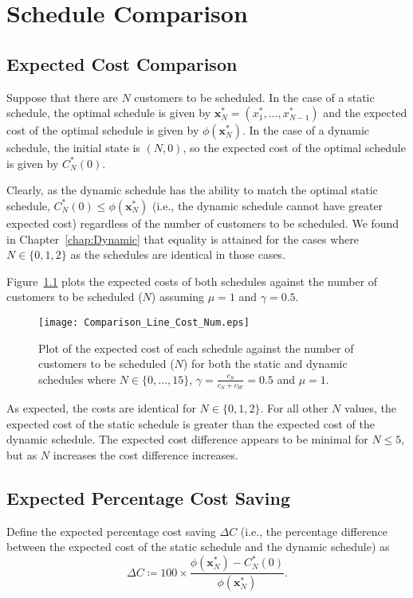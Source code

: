 \chapter{Schedule Comparison}
\label{chap:Comparison}
\section{Expected Cost Comparison}
Suppose that there are $N$ customers to be scheduled. In the case of a static schedule, the optimal schedule is given by $\mathbf{x}_{N}^{*} = (x_{1}^{*}, \ldots, x_{N - 1}^{*})$ and the expected cost of the optimal schedule is given by $\phi (\mathbf{x}_{N}^{*})$. In the case of a dynamic schedule, the initial state is $(N, 0)$, so the expected cost of the optimal schedule is given by $C_{N}^{*} (0)$.

Clearly, as the dynamic schedule has the ability to match the optimal static schedule, $C_{N}^{*} (0) \leq \phi (\mathbf{x}_{N}^{*})$ (i.e., the dynamic schedule cannot have greater expected cost) regardless of the number of customers to be scheduled. We found in Chapter~\ref{chap:Dynamic} that equality is attained for the cases where $N \in \{ 0, 1, 2 \}$ as the schedules are identical in those cases.

Figure~\ref{Graph_Cost_Comparison} plots the expected costs of both schedules against the number of customers to be scheduled ($N$) assuming $\mu = 1$ and $\gamma = 0.5$.
\begin{figure}[htb]
	\centering
	\texttt{[image: Comparison\_Line\_Cost\_Num.eps]}
	\caption{Plot of the expected cost of each schedule against the number of customers to be scheduled ($N$) for both the static and dynamic schedules where $N \in \{ 0, \ldots, 15 \}$, $\gamma = \frac{c_{S}}{c_{S} + c_{W}} = 0.5$ and $\mu = 1$.}
	\label{Graph_Cost_Comparison}
\end{figure}

As expected, the costs are identical for $N \in \{ 0, 1, 2 \}$. For all other $N$ values, the expected cost of the static schedule is greater than the expected cost of the dynamic schedule. The expected cost difference appears to be minimal for $N \leq 5$, but as $N$ increases the cost difference increases.

\section{Expected Percentage Cost Saving}
Define the expected percentage cost saving $\Delta C$ (i.e., the percentage difference between the expected cost of the static schedule and the dynamic schedule) as
\begin{equation}
	\Delta C \coloneqq 100 \times \frac{\phi (\mathbf{x}_{N}^{*}) - C_{N}^{*} (0)}{\phi (\mathbf{x}_{N}^{*})}.
\end{equation}

